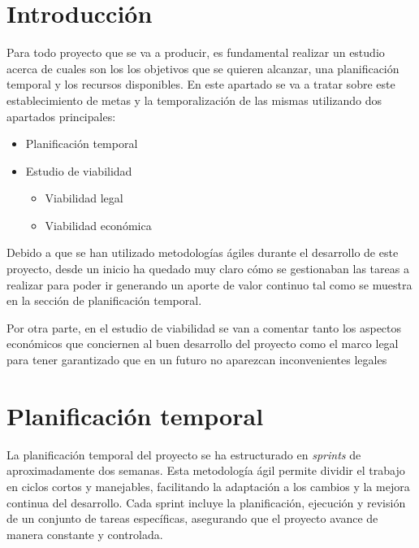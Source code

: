 
\section{Introducción}

Para todo proyecto que se va a producir, es fundamental realizar un estudio acerca de cuales son los los objetivos que se quieren alcanzar, una planificación temporal y los recursos disponibles.
En este apartado se va a tratar sobre este establecimiento de metas y la temporalización de las mismas utilizando dos apartados principales:
\begin{itemize}
    \item Planificación temporal
    \item Estudio de viabilidad
    \begin{itemize}
        \item Viabilidad legal
        \item Viabilidad económica

    \end{itemize}

\end{itemize}


Debido a que se han utilizado metodologías ágiles durante el desarrollo de este proyecto, desde un inicio ha quedado muy claro cómo se gestionaban las tareas a realizar para poder ir generando un aporte de valor continuo tal como se muestra en la sección de planificación temporal.

Por otra parte, en el estudio de viabilidad se van a comentar tanto los aspectos económicos que conciernen al buen desarrollo del proyecto como el marco legal para tener garantizado que en un futuro no aparezcan inconvenientes legales

\section{Planificación temporal}
La planificación temporal del proyecto se ha estructurado en \textit{sprints} de aproximadamente dos semanas. Esta metodología ágil permite dividir el trabajo en ciclos cortos y manejables, facilitando la adaptación a los cambios y la mejora continua del desarrollo. Cada sprint incluye la planificación, ejecución y revisión de un conjunto de tareas específicas, asegurando que el proyecto avance de manera constante y controlada.

